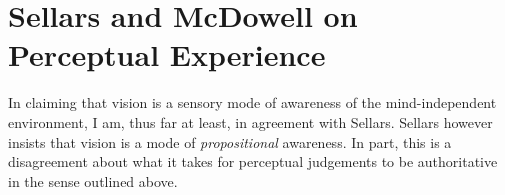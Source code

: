 \documentclass[12pt]{article}
\begin{document}

\section{Sellars and McDowell on Perceptual Experience} %
\label{sec:mcdowell_on_sellars_on_perception}

In claiming that vision is a sensory mode of awareness of the mind-independent environment, I am, thus far at least, in agreement with Sellars. Sellars however insists that vision is a mode of \emph{propositional} awareness. In part, this is a disagreement about what it takes for perceptual judgements to be authoritative in the sense outlined above. %
\end{document}

